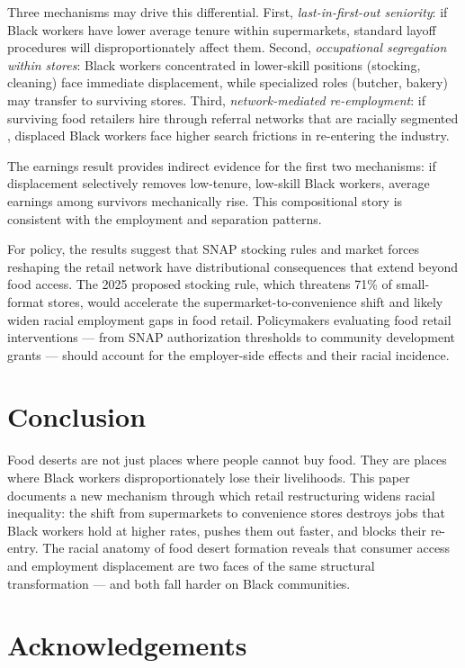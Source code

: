 \documentclass[12pt]{article}
\begin{document}
Three mechanisms may drive this differential. First, \textit{last-in-first-out seniority}: if Black workers have lower average tenure within supermarkets, standard layoff procedures will disproportionately affect them. Second, \textit{occupational segregation within stores}: Black workers concentrated in lower-skill positions (stocking, cleaning) face immediate displacement, while specialized roles (butcher, bakery) may transfer to surviving stores. Third, \textit{network-mediated re-employment}: if surviving food retailers hire through referral networks that are racially segmented \citep{wilson1987truly}, displaced Black workers face higher search frictions in re-entering the industry.

The earnings result provides indirect evidence for the first two mechanisms: if displacement selectively removes low-tenure, low-skill Black workers, average earnings among survivors mechanically rise. This compositional story is consistent with the employment and separation patterns.

For policy, the results suggest that SNAP stocking rules and market forces reshaping the retail network have distributional consequences that extend beyond food access. The 2025 proposed stocking rule, which threatens 71\% of small-format stores, would accelerate the supermarket-to-convenience shift and likely widen racial employment gaps in food retail. Policymakers evaluating food retail interventions --- from SNAP authorization thresholds to community development grants --- should account for the employer-side effects and their racial incidence.

\section{Conclusion}

Food deserts are not just places where people cannot buy food. They are places where Black workers disproportionately lose their livelihoods. This paper documents a new mechanism through which retail restructuring widens racial inequality: the shift from supermarkets to convenience stores destroys jobs that Black workers hold at higher rates, pushes them out faster, and blocks their re-entry. The racial anatomy of food desert formation reveals that consumer access and employment displacement are two faces of the same structural transformation --- and both fall harder on Black communities.

\section*{Acknowledgements}
\end{document}
